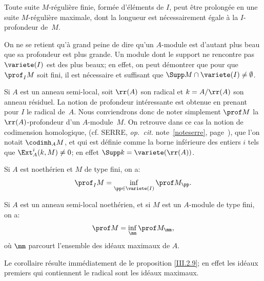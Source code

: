 \enlargethispage{1.2\baselineskip}%
\begin{corollaire} \label{III.2.6}
Toute suite $M$-r\'eguli\`ere finie, form\'ee d'\'el\'ements de $I$, peut \^etre prolong\'ee en une suite $M$-r\'eguli\`ere maximale, dont la longueur est n\'ecessairement \'egale \`a la $I$-profondeur de~$M$.
\end{corollaire}

\begin{remarque} \label{III.2.7}
On ne se retient qu'\`a grand peine de dire qu'un $A$-module est d'autant plus beau que sa profondeur est plus grande. Un module dont le support ne rencontre pas $\variete (I)$ est des plus beaux; en effet, on peut d\'emontrer que pour que $\prof_I M$ soit fini, il est n\'ecessaire et suffisant que $\Supp M \cap \variete(I) \neq \emptyset$.
\end{remarque}

\begin{remarque} \label{III.2.8}
Si $A$ est un anneau semi-local, soit $\rr(A)$ son radical et $k=A/\rr(A)$ son anneau r\'esiduel. La notion de profondeur int\'eressante est obtenue en prenant pour $I$ le radical de~$A$. Nous conviendrons donc de noter simplement $\prof M$ la $\rr(A)$-profondeur d'un $A$-module~$M$. On retrouve dans ce cas la notion de \og codimension homologique\fg, (cf. SERRE, \textit{op.\, cit.} note~\eqref{noteserre}, page~\pageref{noteserre}), que l'on notait $\codimh_A M$, et qui est d\'efinie comme la borne inf\'erieure des entiers $i$ tels que $\Ext_A^i(k, M)\neq 0$; en effet $\Supp k = \variete(\rr(A))$.
\end{remarque}

\begin{proposition} \label{III.2.9}
Si $A$ est noeth\'erien et $M$ de type fini, on a:
\[
\prof_I M = \inf_{\pp \in \variete (I)} \prof M_\pp.
\]
\end{proposition}

\begin{corollaire} \label{III.2.10}
Si $A$ est un anneau semi-local noeth\'erien, et si $M$ est un $A$-module de type fini, on a:
\[
\prof M = \inf_\mm \prof M_\mm,
\]
o\`u $\mm $ parcourt l'ensemble des id\'eaux maximaux de $A$.
\end{corollaire}

Le corollaire r\'esulte imm\'ediatement de le proposition \ref{III.2.9}; en effet les id\'eaux premiers qui contiennent le radical sont les id\'eaux maximaux.

